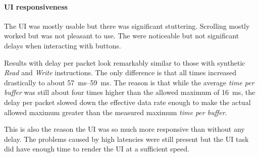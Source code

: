 \paragraph{UI responsiveness}

The UI was mostly usable but there was significant stuttering. Scrolling mostly worked but was not
pleasant to use. The were noticeable but not significant delays when interacting with buttons. 
\bigbreak

Results with delay per packet look remarkably similar to those with synthetic \textit{Read} and
\textit{Write} instructions. The only difference is that all times increased drastically to about
\SIrange{57}{59}{\milli\second}. The reason is that while the average \textit{time per buffer} was
still about four times higher than the allowed maximum of \SI{16}{\milli\second}, the delay per
packet slowed down the effective data rate enough to make the actual allowed maximum greater than
the measured maximum \textit{time per buffer}.

This is also the reason the UI was so much more responsive than without any delay. The problems
caused by high latencies were still present but the UI task did have enough time to render the UI
at a sufficient speed.
